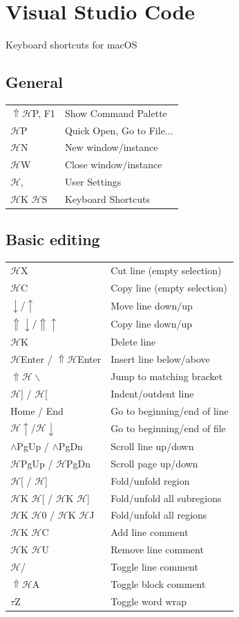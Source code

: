 \documentclass[UTF8]{article}
\begin{document}
\section*{Visual Studio Code}
Keyboard shortcuts for macOS

\subsection*{General}
\begin{tabular}{ll}
$\Uparrow\mathscr{H}$P, F1 & Show Command Palette \\
$\mathscr{H}$P & Quick Open, Go to File... \\
$\mathscr{H}$N & New window/instance \\
$\mathscr{H}$W & Close window/instance \\
$\mathscr{H}$, & User Settings \\
$\mathscr{H}$K $\mathscr{H}$S & Keyboard Shortcuts \\
\end{tabular}

\subsection*{Basic editing}
\begin{tabular}{ll}
$\mathscr{H}$X & Cut line (empty selection) \\
$\mathscr{H}$C & Copy line (empty selection) \\
$\downarrow / \uparrow$ & Move line down/up \\
$\Uparrow\downarrow / \Uparrow\uparrow$ & Copy line down/up \\
$\mathscr{H}$K & Delete line \\
$\mathscr{H}$Enter / $\Uparrow\mathscr{H}$Enter & Insert line below/above \\
$\Uparrow\mathscr{H}\backslash$ & Jump to matching bracket \\
$\mathscr{H}$] / $\mathscr{H}$[ & Indent/outdent line \\
Home / End & Go to beginning/end of line \\
$\mathscr{H}\uparrow / \mathscr{H}\downarrow$ & Go to beginning/end of file \\
$\wedge$PgUp / $\wedge$PgDn & Scroll line up/down \\
$\mathscr{H}$PgUp / $\mathscr{H}$PgDn & Scroll page up/down \\
$\mathscr{H}$[ / $\mathscr{H}$] & Fold/unfold region \\
$\mathscr{H}$K $\mathscr{H}$[ / $\mathscr{H}$K $\mathscr{H}$] & Fold/unfold all subregions \\
$\mathscr{H}$K $\mathscr{H}$0 / $\mathscr{H}$K $\mathscr{H}$J & Fold/unfold all regions \\
$\mathscr{H}$K $\mathscr{H}$C & Add line comment \\
$\mathscr{H}$K $\mathscr{H}$U & Remove line comment \\
$\mathscr{H}$/ & Toggle line comment \\
$\Uparrow\mathscr{H}$A & Toggle block comment \\
$\tau$Z & Toggle word wrap \\
\end{tabular}
\end{document}

